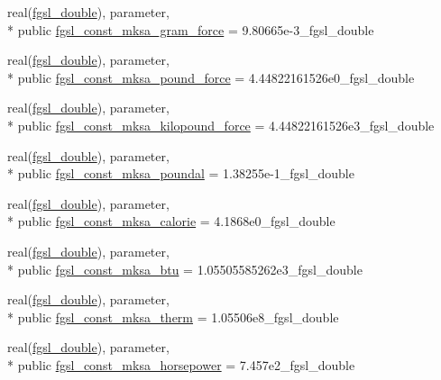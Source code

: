 \begin{DoxyCompactItemize}
\item 
real(\hyperlink{classfgsl_a9af5113378e0f000eb479d3f90196ddf}{fgsl\-\_\-double}), parameter, \\*
public \hyperlink{classfgsl_ac3e7e21c6fe9874df8a9b7583e343e76}{fgsl\-\_\-const\-\_\-mksa\-\_\-gram\-\_\-force} = 9.\-80665e-\/3\-\_\-fgsl\-\_\-double
\item 
real(\hyperlink{classfgsl_a9af5113378e0f000eb479d3f90196ddf}{fgsl\-\_\-double}), parameter, \\*
public \hyperlink{classfgsl_af568f44c87cf706dcc1fe887c5a68604}{fgsl\-\_\-const\-\_\-mksa\-\_\-pound\-\_\-force} = 4.\-44822161526e0\-\_\-fgsl\-\_\-double
\item 
real(\hyperlink{classfgsl_a9af5113378e0f000eb479d3f90196ddf}{fgsl\-\_\-double}), parameter, \\*
public \hyperlink{classfgsl_a7c76b512b50dc8300612e051816e5ede}{fgsl\-\_\-const\-\_\-mksa\-\_\-kilopound\-\_\-force} = 4.\-44822161526e3\-\_\-fgsl\-\_\-double
\item 
real(\hyperlink{classfgsl_a9af5113378e0f000eb479d3f90196ddf}{fgsl\-\_\-double}), parameter, \\*
public \hyperlink{classfgsl_a6679d0f4bba1852ff847f920c8f8ad2b}{fgsl\-\_\-const\-\_\-mksa\-\_\-poundal} = 1.\-38255e-\/1\-\_\-fgsl\-\_\-double
\item 
real(\hyperlink{classfgsl_a9af5113378e0f000eb479d3f90196ddf}{fgsl\-\_\-double}), parameter, \\*
public \hyperlink{classfgsl_acb71a08b4387dc29400805067d9aa6ec}{fgsl\-\_\-const\-\_\-mksa\-\_\-calorie} = 4.\-1868e0\-\_\-fgsl\-\_\-double
\item 
real(\hyperlink{classfgsl_a9af5113378e0f000eb479d3f90196ddf}{fgsl\-\_\-double}), parameter, \\*
public \hyperlink{classfgsl_a868742553429b50b469d7d21a481cc66}{fgsl\-\_\-const\-\_\-mksa\-\_\-btu} = 1.\-05505585262e3\-\_\-fgsl\-\_\-double
\item 
real(\hyperlink{classfgsl_a9af5113378e0f000eb479d3f90196ddf}{fgsl\-\_\-double}), parameter, \\*
public \hyperlink{classfgsl_ae80985230902a792be876b10eac1a358}{fgsl\-\_\-const\-\_\-mksa\-\_\-therm} = 1.\-05506e8\-\_\-fgsl\-\_\-double
\item 
real(\hyperlink{classfgsl_a9af5113378e0f000eb479d3f90196ddf}{fgsl\-\_\-double}), parameter, \\*
public \hyperlink{classfgsl_af97c5cddea274909ba83c36dc36e90a3}{fgsl\-\_\-const\-\_\-mksa\-\_\-horsepower} = 7.\-457e2\-\_\-fgsl\-\_\-double

\end{DoxyCompactItemize}
